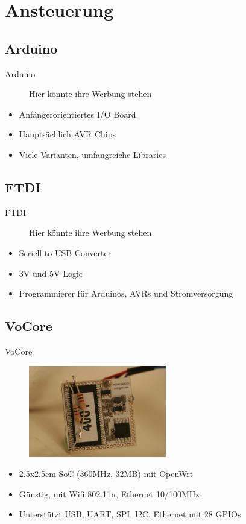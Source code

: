 \documentclass{beamer}
\begin{document}
\section{Ansteuerung}
\subsection{Arduino}
\begin{frame}{Arduino}
\begin{figure}[h]
 \centering
 Hier könnte ihre Werbung stehen
\end{figure}
\begin{itemize}
 \item Anfängerorientiertes I/O Board
 \item Hauptsächlich AVR Chips
 \item Viele Varianten, umfangreiche Libraries

\end{itemize}
\end{frame}

\subsection{FTDI}
\begin{frame}{FTDI}
\begin{figure}[h]
 \centering
 Hier könnte ihre Werbung stehen
\end{figure}
\begin{itemize}
 \item Seriell to USB Converter
 \item 3V und 5V Logic
 \item Programmierer für Arduinos, AVRs und Stromversorgung
\end{itemize}

\end{frame}


\subsection{VoCore}
\begin{frame}{VoCore}
\begin{figure}[h]
 \centering
 \includegraphics[width=6cm,keepaspectratio=true]{./img/_MG_4492.JPG}
\end{figure}
\begin{itemize}
 \item 2.5x2.5cm SoC (360MHz, 32MB) mit OpenWrt
 \item Günstig, mit Wifi 802.11n, Ethernet 10/100MHz
 \item Unterstützt USB, UART, SPI, I2C, Ethernet mit 28 GPIOs
\end{itemize}
\end{frame}
\end{document}
